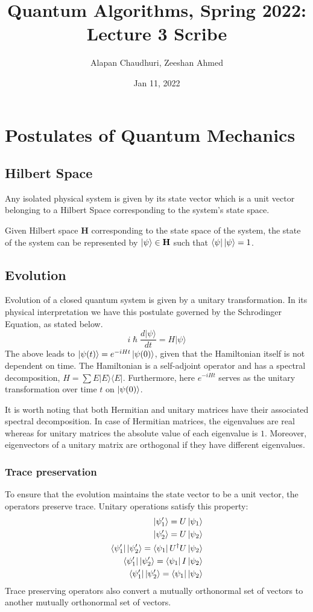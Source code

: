 \documentclass[11.5pt, paper=a4]{article}
\title{Quantum Algorithms, Spring 2022: Lecture 3 Scribe}
\author{Alapan Chaudhuri, Zeeshan Ahmed}
\date{Jan 11, 2022}
\theoremstyle{definition}
\numberwithin{theorem}{section}
\begin{document}
\maketitle

\section{Postulates of Quantum Mechanics}
\subsection{Hilbert Space}
Any isolated physical system is given by its state vector which is a unit vector belonging to a Hilbert Space corresponding to the system's state space.

Given Hilbert space $\mathbf{H}$ corresponding to the state space of the system, the state of the system can be represented by $\ket{\psi} \in \mathbf{H}$ such that $\bra{\psi}\ket{\psi} = 1$.

\subsection{Evolution}
Evolution of a closed quantum system is given by a unitary transformation. In its physical interpretation we have this postulate governed by the Schrodinger Equation, as stated below.
$$
i{\hslash}\frac{d\vert\psi\rangle}{dt} = H\vert\psi\rangle
$$
The above leads to $\ket{\psi(t)} = e^{-iHt}\ket{\psi(0)}$, given that the Hamiltonian itself is not dependent on time. The Hamiltonian is a self-adjoint operator and has a spectral decomposition, $H = \sum E\vert E\rangle\langle E\vert$. Furthermore, here $e^{-iHt}$ serves as the unitary transformation over time $t$ on $\ket{\psi(0)}$.\newline

It is worth noting that both Hermitian and unitary matrices have their associated spectral decomposition. In case of Hermitian matrices, the eigenvalues are real whereas for unitary matrices the absolute value of each eigenvalue is $1$. Moreover, eigenvectors of a unitary matrix are orthogonal if they have different eigenvalues.

\subsubsection{Trace preservation}
To ensure that the evolution maintains the state vector to be a unit vector, the operators preserve trace. Unitary operations satisfy this property:
\begin{align*}
    \ket{\psi_1'} = U \ket{\psi_1} \\
    \ket{\psi_2'} = U \ket{\psi_2} \\
    \bra{\psi_1'}\ket{\psi_2'} = \bra{\psi_1}U^\dag U \ket{\psi_2} \\
    \bra{\psi_1'}\ket{\psi_2'} = \bra{\psi_1} I \ket{\psi_2} \\
    \bra{\psi_1'}\ket{\psi_2'} = \bra{\psi_1} \ket{\psi_2} \\
\end{align*}
Trace preserving operators also convert a mutually orthonormal set of vectors to another mutually orthonormal set of vectors.
\end{document}
